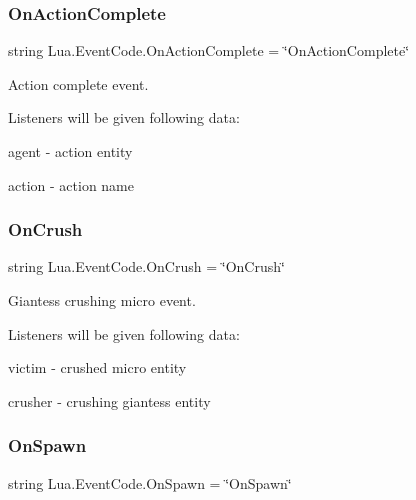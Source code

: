 \subsubsection{\texorpdfstring{On\+Action\+Complete}{OnActionComplete}}
{\footnotesize\ttfamily string Lua.\+Event\+Code.\+On\+Action\+Complete = \char`\"{}On\+Action\+Complete\char`\"{}\hspace{0.3cm}{\ttfamily [static]}}



Action complete event. 

Listeners will be given following data\+:
\begin{DoxyItemize}
\item {\ttfamily agent} -\/ action entity
\item {\ttfamily action} -\/ action name 
\end{DoxyItemize}\mbox{\label{class_lua_1_1_event_code_af0028cf602b24a1865397d0cf1df1623}} 
\subsubsection{\texorpdfstring{On\+Crush}{OnCrush}}
{\footnotesize\ttfamily string Lua.\+Event\+Code.\+On\+Crush = \char`\"{}On\+Crush\char`\"{}\hspace{0.3cm}{\ttfamily [static]}}



Giantess crushing micro event. 

Listeners will be given following data\+:
\begin{DoxyItemize}
\item {\ttfamily victim} -\/ crushed micro entity
\item {\ttfamily crusher} -\/ crushing giantess entity 
\end{DoxyItemize}\mbox{\label{class_lua_1_1_event_code_a30395eacc4a00fc49a4311b95d23727d}} 
\subsubsection{\texorpdfstring{On\+Spawn}{OnSpawn}}
{\footnotesize\ttfamily string Lua.\+Event\+Code.\+On\+Spawn = \char`\"{}On\+Spawn\char`\"{}\hspace{0.3cm}{\ttfamily [static]}}



